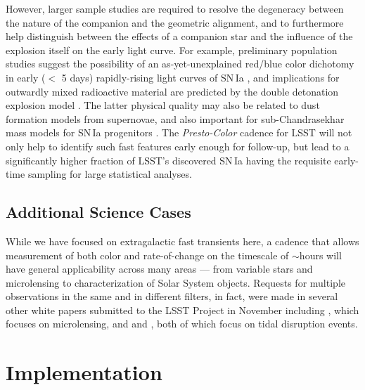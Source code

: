 \documentclass[letterpaper,longauthor,trackchanges,twocolumn,onecolappendix,sort&compress]{aastex62}
\begin{document}
However, larger sample studies are required to resolve the degeneracy between the nature of the companion and the geometric alignment, and to furthermore help distinguish between the effects of a companion star and the influence of the explosion itself on the early light curve. For example, preliminary population studies suggest the possibility of an as-yet-unexplained red/blue color dichotomy in early ($<$ 5 days) rapidly-rising light curves of SN\,Ia \citep{Stritzinger2018}, and implications for outwardly mixed radioactive material are predicted by the double detonation explosion model \citep{Piro2016,Polin2018}. The latter physical quality may also be related to dust formation models from supernovae, and also important for sub-Chandrasekhar mass models for SN\,Ia progenitors \citep{Polin2018}. The {\em Presto-Color} cadence for LSST will not only help to identify such fast features early enough for follow-up, but lead to a significantly higher fraction of LSST's discovered SN\,Ia having the requisite early-time sampling for large statistical analyses.

\subsection{Additional Science Cases}\label{sec:additional}

While we have focused on extragalactic fast transients here, a cadence that allows measurement of both color and rate-of-change on the timescale of $\sim$hours will have general applicability across many areas --- from variable stars and microlensing to characterization of Solar System objects. Requests for multiple observations in the same and in different filters, in fact, were made in several other white papers submitted to the LSST Project in November including \citet{streetWP}, which focuses on microlensing, and  \citet{Bricman2018} and \citet{Gezari2018}, both of which focus on tidal disruption events.



\section{Implementation}\label{sec:implementation}
\end{document}
